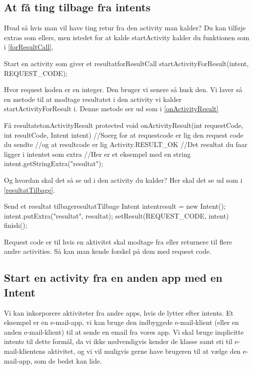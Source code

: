 \subsection{At få ting tilbage fra intents}
Hvad så hvis man vil have ting retur fra den activity man kalder? Du kan tilføje extras som ellers, men istedet for at kalde startActivity kalder du funktionen som i \autoref{forResultCall},
\begin{JavaCode}{Start en activity som giver et resultat}{forResultCall}
	startActivityForResult(intent, REQUEST_CODE);
\end{JavaCode}
Hvor request koden er en integer. Den bruger vi senere så husk den. Vi laver så en metode til at modtage resultatet i den activity vi kalder startActivityForResult i. Denne metode ser ud som i \autoref{onActivityResult}
\begin{JavaCode}{Få resultatet}{onActivityResult}
	protected void onActivityResult(int requestCode, int resultCode, Intent intent){
		//Soerg for at requestcode er lig den request code du sendte
		//og at resultcode er lig Activity.RESULT_OK
		//Det resultat du faar ligger i intentet som extra
		//Her er et eksempel med en string
		intent.getStringExtra("resultat");
	}
\end{JavaCode}

Og hvordan skal det så se ud i den activity du kalder? Her skal det se ud som i \autoref{resultatTilbage}.
\begin{JavaCode}{Send et resultat tilbage}{resultatTilbage}
	Intent intentresult = new Intent();
	intent.putExtra("resultat", resultat);
	setResult(REQUEST_CODE, intent)
	finish();
\end{JavaCode}
Request code er til hvis en aktivitet skal modtage fra eller returnere til flere andre activities. Så kan man kende forskel på dem med request code. 

\subsection{Start en activity fra en anden app med en Intent}

Vi kan inkorporere aktiviteter fra andre apps, hvis de lytter efter intents. Et eksempel er en e-mail-app, vi kan bruge den indbyggede e-mail-klient (eller en anden e-mail-klient) til at sende en email fra vores app. Vi skal bruge implicitte intents til dette formål, da vi ikke nødvendigvis kender de klasse samt sti til e-mail-klientens aktivitet, og vi vil muligvis gerne have brugeren til at vælge den e-mail-app, som de bedst kan lide.


